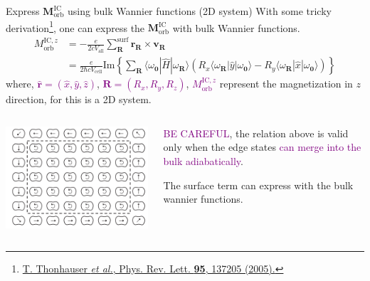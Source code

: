 \documentclass{beamer}
\newcommand{\purple}{\textcolor{purple}}
\begin{document}
    \begin{frame}{Express \(\bm{M}_{\text{orb}}^{\text{IC}}\) using bulk Wannier functions (2D system)}
      \scriptsize
      With some tricky derivation\footnote{\tiny \href{https://doi.org/10.1103/PhysRevLett.95.137205}{T. Thonhauser \emph{et al.}, Phys. Rev. Lett. \textbf{95}, 137205 (2005).}}, one can express the \(\bm{M}_{\text{orb}}^{\text{IC}}\) with bulk Wannier functions.
      \begin{equation}\begin{aligned}
        M_{\text{orb}}^{\text{IC}, z} &= -\frac{e}{2cV_{\text{all}}}\sum_{\bm{R}}^{\text{surf}} \bm{r}_{\bm{R}}\times\bm{v}_{\bm{R}}\\
        &= \frac{e}{2\hbar{}cV_{\text{cell}}}\text{Im}\left\{\sum_{\bm{R}} \langle\omega_{\bm{0}}|\widehat{H}|\omega_{\bm{R}}\rangle\left(R_x\langle\omega_{\bm{R}}|\widehat{y}|\omega_{\bm{0}}\rangle - R_y\langle\omega_{\bm{R}}|\widehat{x}|\omega_{\bm{0}}\rangle\right)\right\}
      \end{aligned}\end{equation}
      where, \purple{\(\widehat{\bm{r}} = (\widehat{x}, \widehat{y}, \widehat{z})\)}, \purple{\(\bm{R} = (R_x, R_y, R_z)\)}, \purple{\(M_{\text{orb}}^{\text{IC}, z}\)} represent the magnetization in \(z\) direction, for this is a 2D system.
     
      \begin{columns}
        \begin{column}{0.3\textwidth}
          \includegraphics[width=\textwidth]{figure/edge-solid2.png}
        \end{column}
        \begin{column}{0.6\textwidth}
          \begin{alertblock}{}
            \purple{BE CAREFUL}, the relation above is valid only when the edge states \purple{can merge into the bulk adiabatically}.
          \end{alertblock}
          \begin{block}{}
            The surface term can express with the bulk wannier functions.
          \end{block}
        \end{column}
      \end{columns}
    \end{frame}
\end{document}
